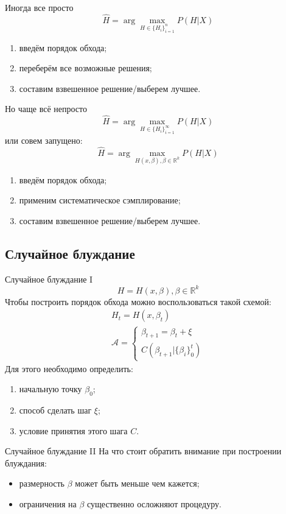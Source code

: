\documentclass[14pt, fleqn, xcolor={dvipsnames, table}]{beamer}
\begin{document}
\begin{frame}{Иногда все просто}
$$
\hat{H} = \arg\max_{H \in \{H_i\}_{i=1}^n} P(H|X)
$$
\begin{enumerate}
  \item введём порядок обхода;
  \item переберём все возможные решения;
  \item составим взвешенное решение/выберем лучшее.
\end{enumerate}
\end{frame}

\begin{frame}{Но чаще всё непросто}
$$
\hat{H} = \arg\max_{H \in \{H_i\}_{i=1}^\infty} P(H|X)
$$
или совем запущено:
$$
\hat{H} = \arg\max_{H(x, \beta), \beta \in \mathbb{R}^k} P(H|X)
$$

\begin{enumerate}
  \item введём порядок обхода;
  \item применим систематическое сэмплирование;
  \item составим взвешенное решение/выберем лучшее.
\end{enumerate}
\end{frame}

\subsection{Случайное блуждание}
\begin{frame}{Случайное блуждание I}
\small
$$
H = H(x, \beta), \beta \in \mathbb{R}^k
$$
Чтобы построить порядок обхода можно воспользоваться такой схемой:
$$\begin{array}{l}
H_t = H(x, \beta_t) \\
\mathcal{A} = \left\{\begin{array}{l}
\beta_{t+1} = \beta_t + \xi \\ C(\beta_{t+1} | \{\beta_i\}_0^t)
\end{array}\right.
\end{array}$$
Для этого необходимо определить:
\begin{enumerate}
  \item начальную точку $\beta_0$;
  \item способ сделать шаг $\xi$;
  \item условие принятия этого шага $C$.
\end{enumerate}
\end{frame}

\begin{frame}{Случайное блуждание II}
На что стоит обратить внимание при построении блуждания:
\begin{itemize}
  \item размерность $\beta$ может быть меньше чем кажется;
  \item ограничения на $\beta$ существенно осложняют процедуру.
\end{itemize}
\end{frame}
\end{document}
